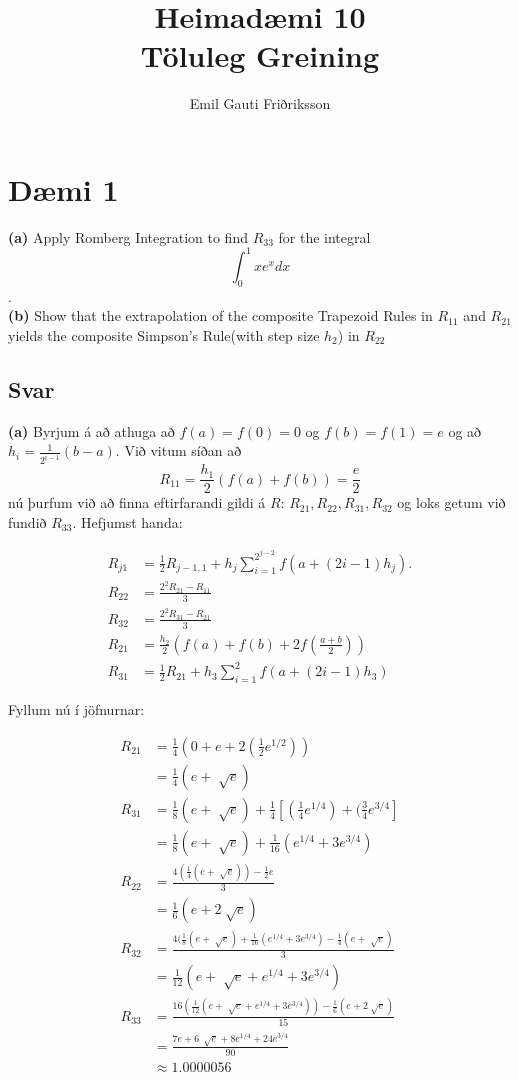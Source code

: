 \documentclass[11pt]{article}
\title{\vspace{-2ex}Heimadæmi 10\\ \vspace{0.2cm} \large Töluleg Greining\vspace{-2ex}}
\author{Emil Gauti Friðriksson}
\begin{document}
\maketitle
\section*{Dæmi 1}
\textbf{(a)} Apply Romberg Integration to find $R_{33}$ for the integral
$$\int_0^1 xe^x dx $$.\\
\noindent \textbf{(b)} Show that the extrapolation of the composite Trapezoid Rules in $R_{11}$ and $R_{21}$ yields the composite Simpson's Rule(with step size $h_2$) in $R_{22}$

\subsection*{Svar}
\textbf{(a)} Byrjum á að athuga að $f(a) = f(0) = 0$ og $f(b) = f(1) = e$ og að $h_i = \frac{1}{2^{i-1}}(b-a)$. Við vitum síðan að
$$R_{11} = \frac{h_1}{2}(f(a)+f(b)) = \frac e2$$
nú þurfum við að finna eftirfarandi gildi á $R$: $R_{21}, R_{22}, R_{31}, R_{32}$ og loks getum við fundið $R_{33}$. Hefjumst handa:

\begin{align*}
R_{j1} &= \frac 12 R_{j-1,1} + h_j\sum_{i=1}^{2^{j-2}} f(a+(2i-1)h_j).\\
R_{22} &= \frac{2^2R_{21}-R_{11}}{3}\\
R_{32} &= \frac{2^2R_{31}-R_{21}}{3}\\
R_{21} &= \frac{h_2}{2}(f(a)+f(b)+2f\left(\frac{a+b}{2}\right))\\
R_{31} &= \frac 12 R_{21}+h_3\sum_{i=1}^2f(a+(2i-1)h_3)
\end{align*}

Fyllum nú í jöfnurnar:

\begin{align*}
R_{21} 	&= \frac 14 (0+e+2(\frac 12 e^{1/2}))\\
		&= \frac 14 (e+\sqrt[]{e})\\
R_{31}	&= \frac 18 (e+\sqrt[]{e})+ \frac 14 \left[(\frac 14 e^{1/4}) + (\frac 34 e^{3/4}\right]\\
		&= \frac 18 (e+\sqrt[]{e}) + \frac{1}{16}(e^{1/4}+3e^{3/4})\\
R_{22}	&= \frac{4(\frac 14 (e+\sqrt[]{e}))-\frac 12 e}{3}\\
		&= \frac{1}{6}(e+2\sqrt[]{e})\\
R_{32}	&= \frac{4(\frac 18 (e+\sqrt[]{e}) + \frac{1}{16}(e^{1/4}+3e^{3/4})-\frac 14 (e+\sqrt[]{e})}{3}\\
		&=\frac{1}{12}(e+\sqrt[]{e}+e^{1/4}+3e^{3/4})\\
R_{33}	&= \frac{16(\frac{1}{12} (e+\sqrt[]{e} + e^{1/4} + 3e^{3/4})) - \frac 16 (e+2\sqrt[]{e})}{15}\\
		&= \frac{7e + 6\,\sqrt[]{e} + 8e^{1/4}+24e^{3/4}}{90}\\
        &\approx 1.0000056
\end{align*}
\end{document}
